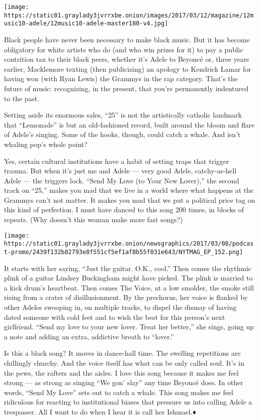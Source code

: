 \texttt{[image: https://static01.graylady3jvrrxbe.onion/images/2017/03/12/magazine/12music10-adele/12music10-adele-master180-v4.jpg]}

Black people have never been necessary to make black music. But it has
become obligatory for white artists who do (and who win prizes for it)
to pay a public contrition tax to their black peers, whether it's Adele
to Beyoncé or, three years earlier, Macklemore texting (then
publicizing) an apology to Kendrick Lamar for having won (with Ryan
Lewis) the Grammys in the rap category. That's the future of music:
recognizing, in the present, that you're permanently indentured to the
past.

Setting aside its enormous sales, ``25'' is not the artistically
catholic landmark that ``Lemonade'' is but an old-fashioned record,
built around the bloom and flare of Adele's singing. Some of the hooks,
though, could catch a whale. And isn't whaling pop's whole point?

Yes, certain cultural institutions have a habit of setting traps that
trigger trauma. But when it's just me and Adele --- very good Adele,
catchy-as-hell Adele --- the triggers lock. ``Send My Love (to Your New
Lover),'' the second track on ``25,'' makes you mad that we live in a
world where what happens at the Grammys can't not matter. It makes you
mad that we put a political price tag on this kind of perfection. I must
have danced to this song 200 times, in blocks of repeats. (Why doesn't
this woman make more fast songs?)

\texttt{[image: https://static01.graylady3jvrrxbe.onion/newsgraphics/2017/03/08/podcast-promo/2439f132b82793e8f551cf5ef1af8b55f031e643/NYTMAG\_EP\_152.png]}

It starts with her saying, ``Just the guitar. O.K., cool.'' Then comes
the rhythmic plink of a guitar Lindsey Buckingham might have picked. The
plink is married to a kick drum's heartbeat. Then comes The Voice, at a
low smolder, the smoke still rising from a crater of disillusionment. By
the prechorus, her voice is flanked by other Adeles swooping in, on
multiple tracks, to dispel the dismay of having dated someone with cold
feet and to wish the best for this person's next girlfriend. ``Send my
love to your new lover. Treat her better,'' she sings, going up a note
and adding an extra, addictive breath to ``lover.''

Is this a black song? It moves in dance-hall time. The swelling
repetitions are chillingly churchy. And the voice itself has what can be
only called soul. It's in the pews, the rafters and the aisles. I love
this song because it makes me feel strong --- as strong as singing ``We
gon' slay'' any time Beyoncé does. In other words, ``Send My Love'' sets
out to catch a whale. This song makes me feel ridiculous for reacting to
institutional biases that pressure us into calling Adele a trespasser.
All I want to do when I hear it is call her Ishmael.♦


